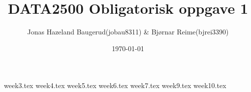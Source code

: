 \documentclass[a4paper,11pt]{article}
\title{DATA2500 Obligatorisk oppgave 1}
\author{Jonas Hazeland Baugerud(jobau8311) \& Bjørnar Reime(bjrei3390)}
\date{\today}
\begin{document}
\maketitle
\newpage
\tableofcontents
\newpage

{week3.tex}
\newpage
{week4.tex}
\newpage
{week5.tex}
\newpage
{week6.tex}
\newpage
{week7.tex}
\newpage
{week9.tex}
\newpage
{week10.tex}
\end{document}
